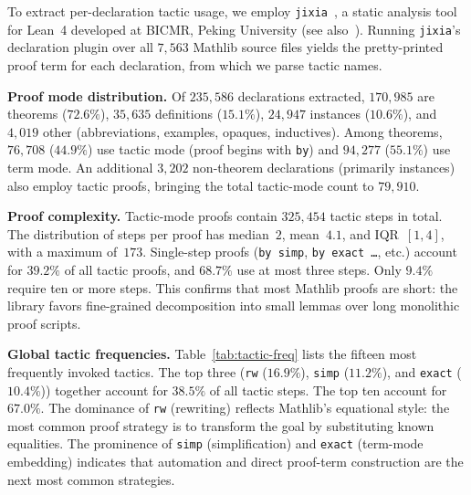 To extract per-declaration tactic usage, we employ \texttt{jixia}~\cite{jixia2024}, a static analysis tool for Lean~4 developed at BICMR, Peking University (see also~\cite{gao2025herald}). Running \texttt{jixia}'s declaration plugin over all $7{,}563$ Mathlib source files yields the pretty-printed proof term for each declaration, from which we parse tactic names.

\smallskip\noindent\textbf{Proof mode distribution.}
Of $235{,}586$ declarations extracted, $170{,}985$ are theorems ($72.6\%$), $35{,}635$ definitions ($15.1\%$), $24{,}947$ instances ($10.6\%$), and $4{,}019$ other (abbreviations, examples, opaques, inductives).
Among theorems, $76{,}708$ ($44.9\%$) use tactic mode (proof begins with \texttt{by}) and $94{,}277$ ($55.1\%$) use term mode. An additional $3{,}202$ non-theorem declarations (primarily instances) also employ tactic proofs, bringing the total tactic-mode count to $79{,}910$.

\smallskip\noindent\textbf{Proof complexity.}
Tactic-mode proofs contain $325{,}454$ tactic steps in total. The distribution of steps per proof has median~$2$, mean~$4.1$, and IQR~$[1, 4]$, with a maximum of~$173$. Single-step proofs (\texttt{by simp}, \texttt{by exact \ldots}, etc.) account for $39.2\%$ of all tactic proofs, and $68.7\%$ use at most three steps. Only $9.4\%$ require ten or more steps. This confirms that most Mathlib proofs are short: the library favors fine-grained decomposition into small lemmas over long monolithic proof scripts.

\smallskip\noindent\textbf{Global tactic frequencies.}
Table~\ref{tab:tactic-freq} lists the fifteen most frequently invoked tactics. The top three (\texttt{rw} ($16.9\%$), \texttt{simp} ($11.2\%$), and \texttt{exact} ($10.4\%$)) together account for $38.5\%$ of all tactic steps. The top ten account for $67.0\%$. The dominance of \texttt{rw} (rewriting) reflects Mathlib's equational style: the most common proof strategy is to transform the goal by substituting known equalities. The prominence of \texttt{simp} (simplification) and \texttt{exact} (term-mode embedding) indicates that automation and direct proof-term construction are the next most common strategies.

